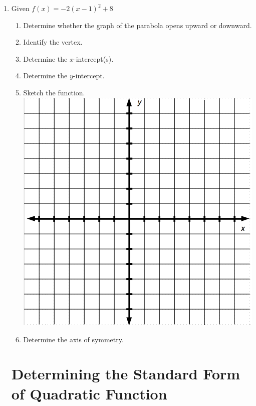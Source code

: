 \documentclass[11pt]{article}
\begin{document}
\begin{enumerate}
\item Given $f(x)=-2(x-1)^2+8$
\begin{enumerate}
\item Determine whether the graph of the parabola opens upward or downward.\\[.3in]
\item Identify the vertex.\\[.3in]
\item Determine the $x$-intercept(s).\\[1in]
\item Determine the $y$-intercept.\\[.5in]
\item Sketch the function.\\
\includegraphics[scale=.5]{bigaxes}\\
\item Determine the axis of symmetry.\\



\end{enumerate}






\newpage



\section{Determining the Standard Form of Quadratic Function}


\end{enumerate}
\end{document}
